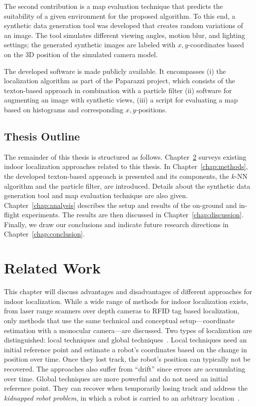 \documentclass{report}
\begin{document}
The second contribution is a map evaluation technique that predicts
the suitability of a given environment for the proposed algorithm. To
this end, a synthetic data generation tool was developed that creates
random variations of an image. The tool simulates different viewing
angles, motion blur, and lighting settings; the generated synthetic
images are labeled with $x,y$-coordinates based on the 3D position of
the simulated camera model.

The developed software is made publicly available. It encompasses (i)
the localization algorithm as part of the Paparazzi project, which
consists of the texton-based approach in combination with a particle
filter (ii) software for augmenting an image with synthetic views,
(iii) a script for evaluating a map based on histograms and
corresponding $x,y$-positions.


\section{Thesis Outline}
\label{sec:outline}

The remainder of this thesis is structured as follows.
Chapter~\ref{chap:relatedwork} surveys existing indoor localization
approaches related to this thesis. In Chapter~\ref{chap:methods}, the
developed texton-based approach is presented and its components, the
$k$-NN algorithm and the particle filter, are introduced. Details about
the synthetic data generation tool and map evaluation technique are
also given. Chapter~\ref{chap:analysis} describes the setup and
results of the on-ground and in-flight experiments. The results are
then discussed in Chapter~\ref{chap:discussion}. Finally, we draw our
conclusions and indicate future research directions in
Chapter~\ref{chap:conclusion}.

\chapter{Related Work}
\label{chap:relatedwork}

This chapter will discuss advantages and disadvantages of different
approaches for indoor localization.
While a wide range of methods for indoor localization exists,
from laser range scanners over depth cameras to RFID tag based
localization, only methods that use the same technical and conceptual
setup---coordinate estimation with a monocular camera---are
discussed. Two types of localization are distinguished: local
techniques and global techniques~\cite{fox1999monte}. Local techniques
need an initial reference point and estimate a robot's coordinates
based on the change in position over time. Once they lost track, the
robot's position can typically not be recovered. The approaches also
suffer from ``drift'' since errors are accumulating over time. Global
techniques are more powerful and do not need an initial reference
point. They can recover when temporarily losing track and address the
\emph{kidnapped robot problem}, in which a robot is carried to an
arbitrary location~\cite{engelson1992error}.
\end{document}
